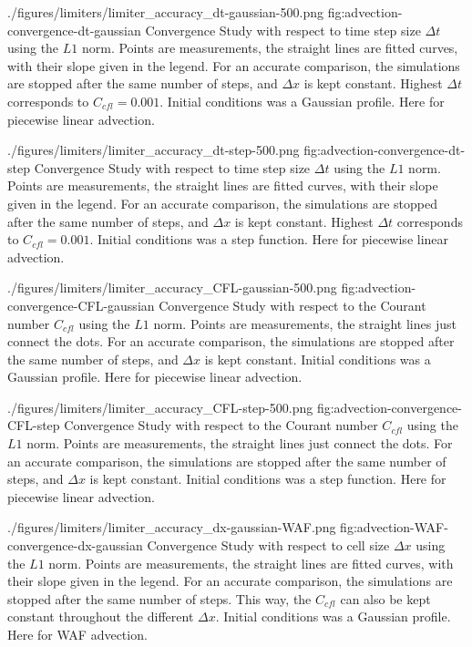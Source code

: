 \quickfigcap
	{./figures/limiters/limiter_accuracy_dt-gaussian-500.png}
	{fig:advection-convergence-dt-gaussian}
	{
		Convergence Study with respect to time step size $\Delta t$ using the $L1$ norm.
		Points are measurements, the straight lines are fitted curves, with their slope given in the legend.
		For an accurate comparison, the simulations are stopped after the same number of steps, and $\Delta x$ is kept constant.
		Highest $\Delta t$ corresponds to $C_{cfl} = 0.001$.
		Initial conditions was a Gaussian profile.
		Here for piecewise linear advection.
	}


\quickfigcap
	{./figures/limiters/limiter_accuracy_dt-step-500.png}
	{fig:advection-convergence-dt-step}
	{
		Convergence Study with respect to time step size $\Delta t$ using the $L1$ norm.
		Points are measurements, the straight lines are fitted curves, with their slope given in the legend.
		For an accurate comparison, the simulations are stopped after the same number of steps, and $\Delta x$ is kept constant.
		Highest $\Delta t$ corresponds to $C_{cfl} = 0.001$.
		Initial conditions was a step function.
		Here for piecewise linear advection.
	}
	



\quickfigcap
	{./figures/limiters/limiter_accuracy_CFL-gaussian-500.png}
	{fig:advection-convergence-CFL-gaussian}
	{
		Convergence Study with respect to the Courant number $C_{cfl}$ using the $L1$ norm.
		Points are measurements, the straight lines just connect the dots.
		For an accurate comparison, the simulations are stopped after the same number of steps, and $\Delta x$ is kept constant.
		Initial conditions was a Gaussian profile.
		Here for piecewise linear advection.
	}


\quickfigcap
	{./figures/limiters/limiter_accuracy_CFL-step-500.png}
	{fig:advection-convergence-CFL-step}
	{
		Convergence Study with respect to the Courant number $C_{cfl}$ using the $L1$ norm.
		Points are measurements, the straight lines just connect the dots.
		For an accurate comparison, the simulations are stopped after the same number of steps, and $\Delta x$ is kept constant.
		Initial conditions was a step function.
		Here for piecewise linear advection.
	}
	











\quickfigcap
	{./figures/limiters/limiter_accuracy_dx-gaussian-WAF.png}
	{fig:advection-WAF-convergence-dx-gaussian}
	{
		Convergence Study with respect to cell size $\Delta x$ using the $L1$ norm.
		Points are measurements, the straight lines are fitted curves, with their slope given in the legend.
		For an accurate comparison, the simulations are stopped after the same number of steps.
		This way, the $C_{cfl}$ can also be kept constant throughout the different $\Delta x$.
		Initial conditions was a Gaussian profile.
		Here for WAF advection.
	}

